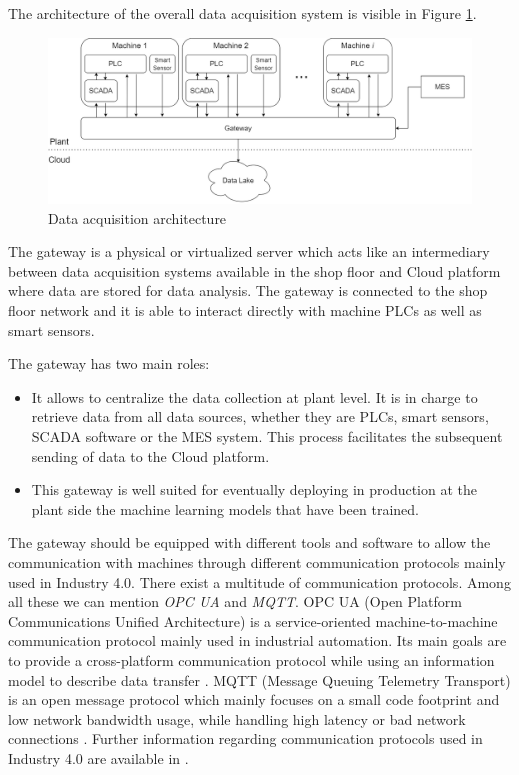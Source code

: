 The architecture of the overall data acquisition system is visible in Figure \ref{fig:data_acquisition_architecture}.

\begin{landscape}
\begin{figure}
\centering
\includegraphics[scale=0.5]{images/chapter_3/Data_acquisition_architecture.png}
\caption{Data acquisition architecture}
\label{fig:data_acquisition_architecture}
\end{figure}
\end{landscape}

The gateway is a physical or virtualized server which acts like an intermediary between data acquisition systems available in the shop floor and Cloud platform where data are stored for data analysis. The gateway is connected to the shop floor network and it is able to interact directly with machine PLCs as well as smart sensors.  

The gateway has two main roles:

\begin{itemize}
    \item It allows to centralize the data collection at plant level. It is in charge to retrieve data from all data sources, whether they are PLCs, smart sensors, SCADA software or the MES system. This process facilitates the subsequent sending of data to the Cloud platform. 
    \item This gateway is well suited for eventually deploying in production at the plant side the machine learning models that have been trained. 
\end{itemize}

The gateway should be equipped with different tools and software to allow the communication with machines through different communication protocols mainly used in Industry 4.0. There exist a multitude of communication protocols. Among all these we can mention \textit{OPC UA} and \textit{MQTT}. OPC UA (Open Platform Communications Unified Architecture) is a service-oriented machine-to-machine communication protocol mainly used in industrial automation. Its main goals are to provide a cross-platform communication protocol while using an information model to describe data transfer \citep{profanter2019opc}. MQTT (Message Queuing Telemetry Transport) is an open message protocol which mainly focuses on a small code footprint and low network bandwidth usage, while handling high latency or bad network connections \citep{profanter2019opc}. Further information regarding communication protocols used in Industry 4.0 are available in \citep{profanter2019opc}\citep{8262021}\citep{zezulka2018communication}.


